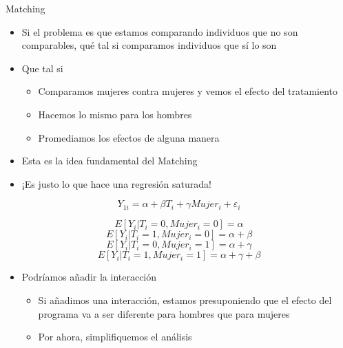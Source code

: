 \documentclass[
  ignorenonframetext,
]{beamer}
\providecommand{\tightlist}{%
  \setlength{\itemsep}{0pt}\setlength{\parskip}{0pt}}
\begin{document}
\begin{frame}{Matching}
\protect\hypertarget{matching}{}
\begin{itemize}
\tightlist
\item
  Si el problema es que estamos comparando individuos que no son
  comparables, qué tal si comparamos individuos que sí lo son
\item
  Que tal si

  \begin{itemize}
  \tightlist
  \item
    Comparamos mujeres contra mujeres y vemos el efecto del tratamiento
  \item
    Hacemos lo mismo para los hombres
  \item
    Promediamos los efectos de alguna manera
  \end{itemize}
\item
  Esta es la idea fundamental del Matching
\end{itemize}
\end{frame}

\begin{frame}{}
\protect\hypertarget{section-36}{}
\begin{itemize}
\tightlist
\item
  ¡Es justo lo que hace una regresión saturada!
\end{itemize}

\[Y_{1i}= \alpha+ \beta T_i+ \gamma Mujer_i+ \varepsilon_i\]

\[E[Y_i| T_{i}=0, Mujer_i=0]=\alpha\]
\[E[Y_i| T_i=1, Mujer_i=0]=\alpha+\beta\]
\[E[Y_i| T_i=0, Mujer_i=1]=\alpha+\gamma\]
\[E[Y_i| T_i=1, Mujer_i=1]=\alpha+\gamma+\beta\]

\begin{itemize}
\tightlist
\item
  Podríamos añadir la interacción

  \begin{itemize}
  \tightlist
  \item
    Si añadimos una interacción, estamos presuponiendo que el efecto del
    programa va a ser diferente para hombres que para mujeres
  \item
    Por ahora, simplifiquemos el análisis
  \end{itemize}
\end{itemize}
\end{frame}
\end{document}
